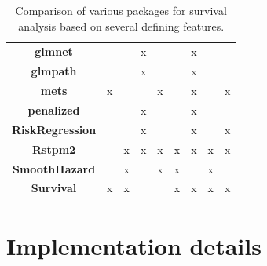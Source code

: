 \documentclass[
]{jss}
\begin{document}
\begin{table}[ht]
{\begin{tabular}{ccccccccc}
\textbf{glmnet}          &                          &                           & x                     &                  &                     & x                        &                                  &                                  \\
\textbf{glmpath}        &                          &                           & x                     &                  &                     & x                        &                                  &                                  \\
\textbf{mets}            & x                        &                           &                       & x                &                     & x                        &                                  & x                                \\
\textbf{penalized}       &                          &                           & x                     &                  &                     & x                        &                                  &                                  \\
\textbf{RiskRegression}  &                          &                           & x                     &                  &                     & x                        &                                  & x                                \\
\textbf{Rstpm2}          &                          & x                         & x                     & x                & x                   & x                        & x                                & x                         \\
\textbf{SmoothHazard}    &                          & x                         &                       & x                & x                   &                          & x                            &                                      \\
\textbf{Survival}        & x                        & x                         &                       &                  & x                   & x                        & x                                & x                               \\
\hline
\end{tabular}%
}
\caption{Comparison of various  packages for survival analysis based on several defining features.}
\label{tab:surv-pkgs}
\end{table}

\hypertarget{implementation-details}{%
\section{Implementation details}\label{implementation-details}}
\end{document}
